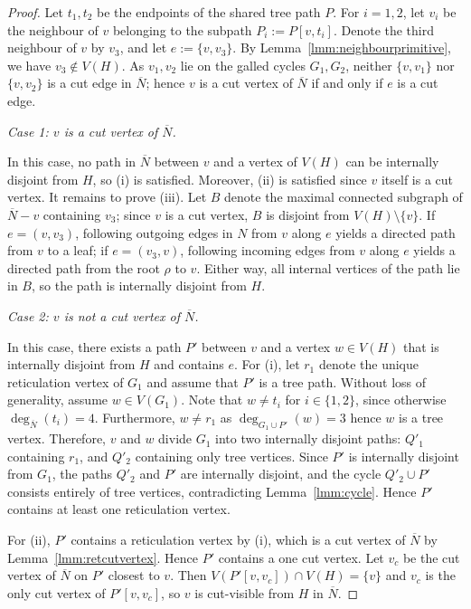 \documentclass[pdflatex,sn-mathphys-num]{sn-jnl}
\theoremstyle{thmstyleone}%
\theoremstyle{thmstyletwo}%
\theoremstyle{thmstylethree}%
\begin{document}
\begin{proof}
Let $t_1, t_2$ be the endpoints of the shared tree path $P$. For $i=1,2$, let $v_i$ be the neighbour of $v$ belonging to the subpath $P_i := P[v,t_i]$. Denote the third neighbour of $v$ by $v_3$, and let $e := \{v,v_3\}$. By Lemma~\ref{lmm:neighbourprimitive}, we have $v_3\notin V(H)$. As $v_1, v_2$ lie on the galled cycles $G_1, G_2$, neither $\{v, v_1\}$ nor $\{v, v_2\}$ is a cut edge in $\overline{N}$; hence $v$ is a cut vertex of $\overline{N}$ if and only if $e$ is a cut edge.

\smallskip
\noindent\textit{Case 1: $v$ is a cut vertex of $\overline{N}$.}

In this case, no path in $\overline{N}$ between $v$ and a vertex of $V(H)$ can be internally disjoint from $H$, so (i) is satisfied. Moreover, (ii) is satisfied since $v$ itself is a cut vertex. It remains to prove (iii). Let $B$ denote the maximal connected subgraph of $\overline{N} - v$ containing $v_3$; since $v$ is a cut vertex, $B$ is disjoint from $V(H) \setminus \{v\}$. If $e=(v,v_3)$, following outgoing edges in $N$ from $v$ along $e$ yields a directed path from $v$ to a leaf; if $e=(v_3,v)$, following incoming edges from $v$ along $e$ yields a directed path from the root $\rho$ to $v$. Either way, all internal vertices of the path lie in $B$, so the path is internally disjoint from $H$.

\smallskip
\noindent\textit{Case 2: $v$ is not a cut vertex of $\overline{N}$.}

In this case, there exists a path $P'$ between $v$ and a vertex $w \in V(H)$ that is internally disjoint from $H$ and contains $e$. For (i), let $r_1$ denote the unique reticulation vertex of $G_1$ and assume that $P'$ is a tree path. Without loss of generality, assume $w \in V(G_1)$. Note that $w \ne t_i$ for $i \in \{1,2\}$, since otherwise $\deg_{\overline{N}}(t_i)=4$. Furthermore, $w\neq r_1$ as $\deg_{G_1 \cup P'}(w)=3$ hence $w$ is a tree vertex. Therefore, $v$ and $w$ divide $G_1$ into two internally disjoint paths: $Q'_1$ containing $r_1$, and $Q'_2$ containing only tree vertices. Since $P'$ is internally disjoint from $G_1$, the paths $Q'_2$ and $P'$ are internally disjoint, and the cycle $Q'_2 \cup P'$ consists entirely of tree vertices, contradicting Lemma~\ref{lmm:cycle}. Hence $P'$ contains at least one reticulation vertex.


For (ii), $P'$ contains a reticulation vertex by (i), which is a cut vertex of $\overline{N}$ by Lemma~\ref{lmm:retcutvertex}. Hence $P'$ contains a one cut vertex. Let $v_c$ be the cut vertex of $\overline{N}$ on $P'$ closest to $v$. Then $V(P'[v,v_c]) \cap V(H) = \{v\}$ and $v_c$ is the only cut vertex of $P'[v,v_c]$, so $v$ is cut-visible from $H$ in $\overline{N}$.



\end{proof}
\end{document}
